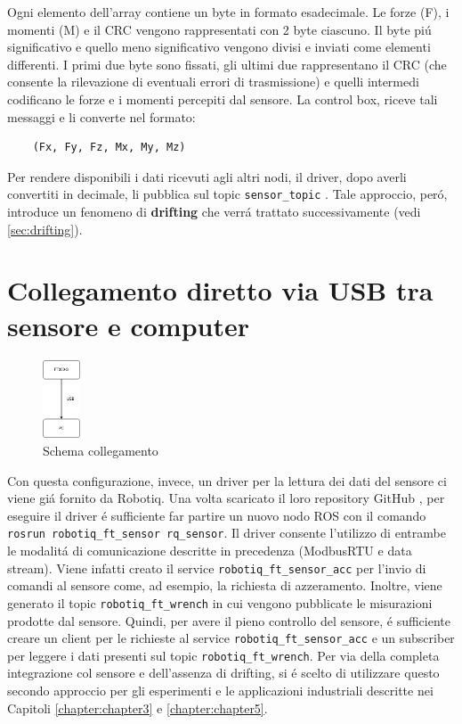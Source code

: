 Ogni elemento dell'array contiene un byte in formato esadecimale. 
Le forze (F), i momenti (M) e il CRC vengono rappresentati con 2 byte ciascuno. Il byte pi\'{u} significativo e quello meno significativo 
vengono divisi e inviati come elementi differenti.
I primi due byte sono fissati, gli ultimi due rappresentano il CRC (che consente la rilevazione di eventuali errori di 
trasmissione) e quelli intermedi codificano le forze e i momenti percepiti dal sensore. 
La control box, riceve tali messaggi e li converte nel formato:
\begin{verbatim}
    (Fx, Fy, Fz, Mx, My, Mz)
\end{verbatim}
Per rendere disponibili i dati ricevuti agli altri nodi, il driver, dopo averli convertiti in decimale, li pubblica sul 
topic \verb|sensor_topic| \cite{ft_driver}. Tale approccio, per\'{o}, introduce un fenomeno di \textbf{drifting} che verr\'{a} 
trattato successivamente (vedi \ref{sec:drifting}).
\section{Collegamento diretto via USB tra sensore e computer}
\begin{figure}[H]
    \centering
    \includegraphics*[width=0.1\textwidth]{images/ft-pc.png}
    \caption{Schema collegamento}
    \label{fig:ft-pc}
\end{figure}
Con questa configurazione, invece, un driver per la lettura dei dati del sensore ci viene gi\'{a} fornito da Robotiq.
Una volta scaricato il loro repository GitHub \cite{robotiq_repo}, per eseguire il driver \'{e} sufficiente far partire 
un nuovo nodo ROS con il comando \verb|rosrun robotiq_ft_sensor rq_sensor|. 
Il driver consente l'utilizzo di entrambe le modalit\'{a} di comunicazione descritte in precedenza (ModbusRTU e data stream).
Viene infatti creato il service \verb|robotiq_ft_sensor_acc| per l'invio di comandi al sensore come, ad esempio, la richiesta 
di azzeramento. Inoltre, viene generato il topic \verb|robotiq_ft_wrench| in cui vengono pubblicate le misurazioni prodotte dal 
sensore. Quindi, per avere il pieno controllo del sensore, \'{e} sufficiente creare un client per le richieste al service 
\verb|robotiq_ft_sensor_acc| e un subscriber per leggere i dati presenti sul topic \verb|robotiq_ft_wrench|. 
Per via della completa integrazione col sensore e dell'assenza di drifting, 
si \'{e} scelto di utilizzare questo secondo approccio per gli esperimenti e le applicazioni industriali descritte nei 
Capitoli \ref{chapter:chapter3} e \ref{chapter:chapter5}.
